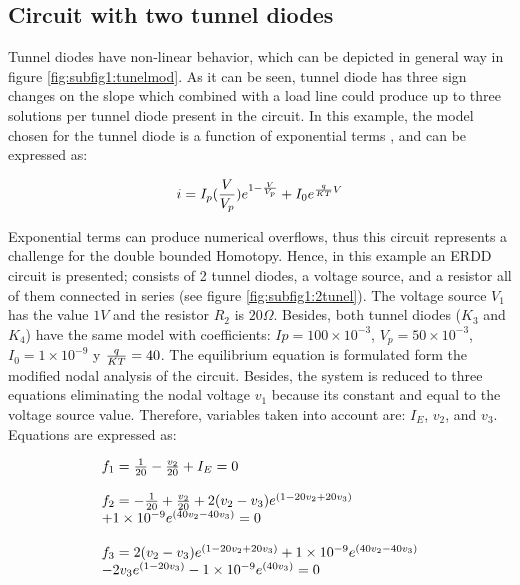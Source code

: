 \documentclass[conference,letterpaper,onecolumn]{IEEEtran}
\begin{document}
{\subsection{Circuit with two tunnel diodes}

Tunnel diodes have non-linear behavior, which can be depicted in general way in figure \ref{fig:subfig1:tunelmod}. As it can be seen, tunnel diode has three sign changes on the slope which combined with a load line could produce up to three solutions per tunnel diode present in the circuit. In this example, the model chosen for the tunnel diode is a function of exponential terms \cite{homo_sze},\cite{homo_shur} and can be expressed as:

\begin{displaymath}
i=I_p({V \over V_p})e^{1-{V \over V_p}}+I_0e^{{q \over {KT}} V}
\end{displaymath}

Exponential terms can produce numerical overflows, thus this circuit represents a challenge for the double bounded Homotopy. Hence, in this example an ERDD circuit is presented; consists of 2 tunnel diodes, a voltage source, and a resistor all of them connected in series (see figure \ref{fig:subfig1:2tunel}). The voltage source $V_1$ has the value $1V$ and the resistor $R_2$ is $20\Omega$. Besides, both tunnel diodes ($K_3$ and $K_4$) have the same model with coefficients:
$Ip=100 \times 10^{-3}$,
$V_p=50 \times 10^{-3} $, $I_0=1\times 10^{-9}$ y ${q \over {KT}} = 40$. The equilibrium equation is formulated form the modified nodal analysis of the circuit. Besides, the system is reduced to three equations eliminating the nodal voltage $v_1$ because its constant and equal to the voltage source value. Therefore, variables taken into account are: $I_E$, $v_2$, and $v_3$. Equations are expressed as:

\begin{displaymath}
\begin{array}{l}
f_1=  {1 \over 20}-{v_2 \over 20}+I_E =0\\ \\
f_2=  -{1 \over 20}+{v_2 \over 20}+2(v_2-v_3)e^{(1-20v_2+20v_3)} \\+1\times 10^{-9}e^{(40v_2-40v_3)} =0 \\\\
f_3=  2(v_2-v_3)e^{(1-20v_2+20v_3)}+1\times 10^{-9}e^{(40v_2-40v_3)} \\ 
-2v_3e^{(1-20v_3)}-1\times 10^{-9} e^{(40v_3)} =0
\end{array}
\end{displaymath}

}
\end{document}
